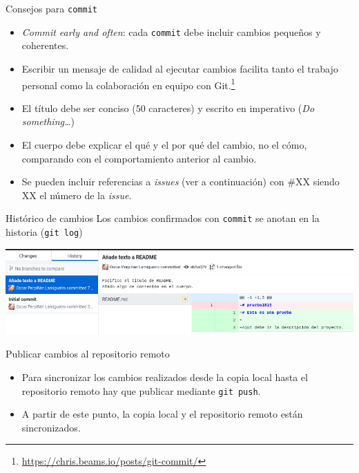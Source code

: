 \documentclass[aspectratio=169, xcolor={usenames,svgnames,dvipsnames}]{beamer}
\begin{document}
\begin{frame}[label={sec:orge820e91},fragile]{Consejos para \texttt{commit}}
 \begin{itemize}
\item \emph{Commit early and often}: cada \texttt{commit} debe incluir cambios pequeños y coherentes.

\item Escribir un mensaje de calidad al ejecutar cambios facilita tanto el trabajo personal como la colaboración en equipo con Git.\footnote{\url{https://chris.beams.io/posts/git-commit/}}

\item El \alert{título} debe ser \alert{conciso} (50 caracteres) y escrito en imperativo (\emph{Do something\ldots{}})

\item El \alert{cuerpo} debe explicar \alert{el qué y el por qué del cambio}, no el cómo, comparando con el comportamiento anterior al cambio.

\item Se pueden incluir referencias a \emph{issues} (ver a continuación) con \#XX siendo XX el número de la \emph{issue}.
\end{itemize}
\end{frame}
\begin{frame}[label={sec:org9257e6a},fragile]{Histórico de cambios}
 Los cambios confirmados con \texttt{commit} se anotan en la historia (\texttt{git log})

\begin{center}
\end{center}

\begin{center}
\includegraphics[width=.9\linewidth]{figs/git_history.png}
\end{center}
\end{frame}


\begin{frame}[label={sec:org0e49736},fragile]{Publicar cambios al repositorio remoto}
 \begin{itemize}
\item Para sincronizar  los cambios realizados \alert{desde la copia local hasta el repositorio remoto} hay que publicar mediante \texttt{git push}.
\end{itemize}

\begin{center}
\end{center}

\begin{itemize}
\item A partir de este punto, la copia local y el repositorio remoto están sincronizados.
\end{itemize}
\end{frame}
\end{document}

